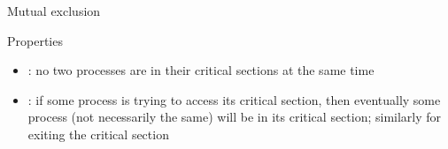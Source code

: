 \documentclass[aspectratio=169]{beamer}
\begin{document}
%
%
%





%
%
%
%
%


\begin{slide}{Mutual exclusion}
\small

\begin{block}{Properties}
\begin{itemize}
\item {}: \alert{no two processes are in their critical sections at the same time}
\item {}: \alert{if some process is trying to access its critical section, then 
eventually some process (not necessarily the same) will be in its critical section; similarly for exiting the critical section}
\end{itemize}
\end{block}
\end{slide}
\end{document}
